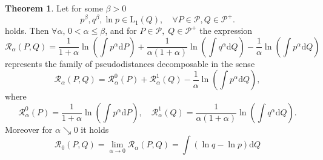 \documentclass[11pt,a4paper]{article}
\theoremstyle{definition}
\theoremstyle{theorem}
\newtheorem{theorem}{Theorem}[section]
\begin{document}
\begin{theorem}
Let for some $\beta>0$
	\begin{equation*}
			p^\beta, q^\beta,\ln{p} \in \mathrm{L}_1(Q), \quad \forall P \in \mathcal{P}, Q \in \mathcal{P^+}.
	\end{equation*}
	holds. Then $\forall \alpha$, $0 < \alpha \leq \beta$, and for $P \in \mathcal{P}, \; Q \in \mathcal{P^+} $ the expression 
	\begin{equation}
		\mathcal{R}_\alpha (P,Q) = \dfrac{1}{1+\alpha}\ln{\left( \int{p^\alpha \mathrm{d}P } \right)} +
		\dfrac{1}{\alpha (1+\alpha)}\ln{\left( \int{q^\alpha \mathrm{d}Q } \right)} -
		\dfrac{1}{\alpha} \ln{\left( \int{p^\alpha \mathrm{d}Q } \right)}
	\end{equation}
		represents the family of pseudodistances decomposable in the sense
	\begin{equation*}
		\mathcal{R}_\alpha (P,Q) = \mathcal{R}_\alpha^0 (P) + \mathcal{R}_\alpha^1 (Q) - \dfrac{1}{\alpha} \ln{\left( \int{p^\alpha \mathrm{d}Q } \right)},
	\end{equation*}	
	where 
	\begin{equation*}
		\mathcal{R}_\alpha^0 (P) = \dfrac{1}{1+\alpha}\ln{\left( \int{p^\alpha \mathrm{d}P } \right)}, \quad \mathcal{R}_\alpha^1 (Q) = \dfrac{1}{\alpha (1+\alpha)}\ln{\left( \int{q^\alpha \mathrm{d}Q } \right)}.
	\end{equation*}
	Moreover for $\alpha \searrow 0$ it holds
	\begin{equation*}
		\mathcal{R}_0 (P,Q) = \lim_{\alpha \rightarrow 0} \mathcal{R}_\alpha (P,Q) =  \int{\left( \ln{q} - \ln{p} \right)\mathrm{d}Q}
	\end{equation*}
\end{theorem}





\pagebreak
\end{document}
